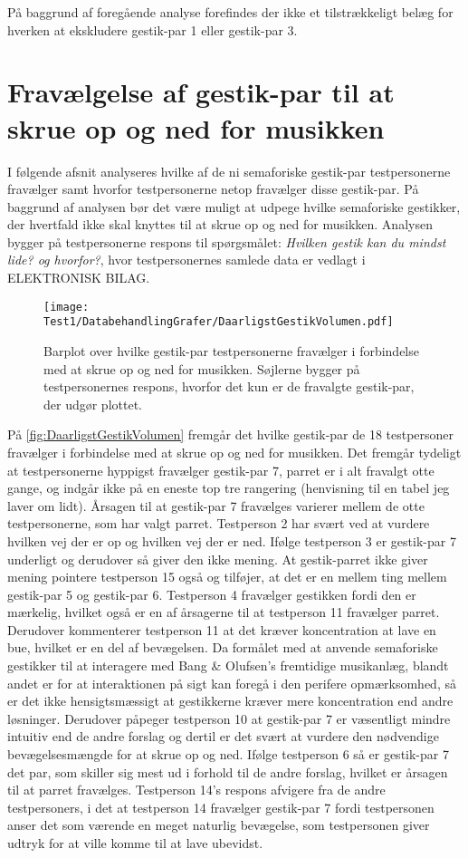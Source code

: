 På baggrund af foregående analyse forefindes der ikke et tilstrækkeligt belæg for hverken at ekskludere gestik-par 1 eller gestik-par 3. 
%
\section{Fravælgelse af gestik-par til at skrue op og ned for musikken}
\label{app:TestresultaterVolumenDaarlig}
%
I følgende afsnit analyseres hvilke af de ni semaforiske gestik-par testpersonerne fravælger samt hvorfor testpersonerne netop fravælger disse gestik-par. På baggrund af analysen bør det være muligt at udpege hvilke semaforiske gestikker, der hvertfald ikke skal knyttes til at skrue op og ned for musikken. Analysen bygger på testpersonerne respons til spørgsmålet: \textit{Hvilken gestik kan du mindst lide? og hvorfor?}, hvor testpersonernes samlede data er vedlagt i ELEKTRONISK BILAG.
%
\begin{figure}[H]
	\centering
	\texttt{[image: Test1/DatabehandlingGrafer/DaarligstGestikVolumen.pdf]}
	\caption{Barplot over hvilke gestik-par testpersonerne fravælger i forbindelse med at skrue op og ned for musikken. Søjlerne bygger på testpersonernes respons, hvorfor det kun er de fravalgte gestik-par, der udgør plottet.}
	\label{fig:DaarligstGestikVolumen}
\end{figure}
\noindent
%
På \autoref{fig:DaarligstGestikVolumen} fremgår det hvilke gestik-par de 18 testpersoner fravælger i forbindelse med at skrue op og ned for musikken. Det fremgår tydeligt at testpersonerne hyppigst fravælger gestik-par 7, parret er i alt fravalgt otte gange, og indgår ikke på en eneste top tre rangering (henvisning til en tabel jeg laver om lidt). Årsagen til at gestik-par 7 fravælges varierer mellem de otte testpersonerne, som har valgt parret. Testperson 2 har svært ved at vurdere hvilken vej der er op og hvilken vej der er ned. Ifølge testperson 3 er gestik-par 7 underligt og derudover så giver den ikke mening. At gestik-parret ikke giver mening pointere testperson 15 også og tilføjer, at det er en mellem ting mellem gestik-par 5 og gestik-par 6. Testperson 4 fravælger gestikken fordi den er mærkelig, hvilket også er en af årsagerne til at testperson 11 fravælger parret. Derudover kommenterer testperson 11 at det kræver koncentration at lave en bue, hvilket er en del af bevægelsen. Da formålet med at anvende semaforiske gestikker til at interagere med Bang $\&$ Olufsen's fremtidige musikanlæg, blandt andet er for at interaktionen på sigt kan foregå i den perifere opmærksomhed, så er det ikke hensigtsmæssigt at gestikkerne kræver mere koncentration end andre løsninger. Derudover påpeger testperson 10 at gestik-par 7 er væsentligt mindre intuitiv end de andre forslag og dertil er det svært at vurdere den nødvendige bevægelsesmængde for at skrue op og ned. Ifølge testperson 6 så er gestik-par 7 det par, som skiller sig mest ud i forhold til de andre forslag, hvilket er årsagen til at parret fravælges. Testperson 14's respons afvigere fra de andre testpersoners, i det at testperson 14 fravælger gestik-par 7 fordi testpersonen anser det som værende en meget naturlig bevægelse, som testpersonen giver udtryk for at ville komme til at lave ubevidst.

